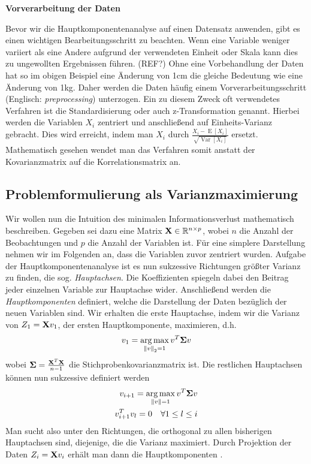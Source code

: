 \textbf{Vorverarbeitung der Daten}

Bevor wir die Hauptkomponentenanalyse auf einen Datensatz anwenden, gibt es einen wichtigen Bearbeitungsschritt zu beachten. Wenn eine Variable weniger variiert als eine Andere aufgrund der verwendeten Einheit oder Skala kann dies zu ungewollten Ergebnissen führen. (REF?) Ohne eine Vorbehandlung der Daten hat so im obigen Beispiel eine Änderung von 1cm die gleiche Bedeutung wie eine Änderung von 1kg.  Daher werden die Daten häufig einem Vorverarbeitungsschritt (Englisch: \textit{preprocessing}) unterzogen. Ein zu diesem Zweck oft verwendetes Verfahren ist die Standardisierung oder auch z-Transformation genannt. Hierbei werden die Variablen $X_i$ zentriert und anschließend auf Einheits-Varianz gebracht. Dies wird erreicht, indem man $X_i$ durch $\frac{X_i - \operatorname{E}[X_i]}{\sqrt{\operatorname{Var}[X_i]}}$ ersetzt. Mathematisch gesehen wendet man das Verfahren somit anstatt der Kovarianzmatrix auf die Korrelationsmatrix an.

\subsection{Problemformulierung als Varianzmaximierung}

Wir wollen nun die Intuition des minimalen Informationsverlust mathematisch beschreiben. Gegeben sei dazu eine Matrix $\mathbf{X} \in \mathbb{R}^{n\times p}$, wobei $n$ die Anzahl der Beobachtungen und $p$ die Anzahl der Variablen ist. Für eine simplere Darstellung nehmen wir im Folgenden an, dass die Variablen zuvor zentriert wurden. Aufgabe der Hauptkomponentenanalyse ist es nun sukzessive Richtungen größter Varianz zu finden, die sog. \textit{Hauptachsen}. Die Koeffizienten spiegeln dabei den Beitrag jeder einzelnen Variable zur Hauptachse wider. Anschließend werden die \textit{Hauptkomponenten} definiert, welche die Darstellung der Daten bezüglich der neuen Variablen sind. Wir erhalten die erste Hauptachse, indem wir die Varianz von $Z_1 = \mathbf{X}v_1$, der ersten Hauptkomponente, maximieren, d.h.
\begin{align}
v_1 = \operatorname*{arg\,max}_{\left\lVert v \right\rVert_2 = 1} v^T \mathbf{\Sigma} v
\end{align}
wobei $\mathbf{\Sigma} = \frac{\mathbf{X}^T\mathbf{X}}{n-1}$ die Stichprobenkovarianzmatrix ist. Die restlichen Hauptachsen können nun sukzessive definiert werden
\begin{align}
\label{pca_variance_maximization}
\begin{split}
v_{i+1} = \operatorname*{arg\,max}_{\left\lVert v \right\rVert = 1} v^T \mathbf{\Sigma} v\\
v_{i+1}^Tv_l = 0 \quad \forall 1 \leq l \leq i
\end{split}
\end{align}
Man sucht also unter den Richtungen, die orthogonal zu allen bisherigen Hauptachsen sind, diejenige, die die Varianz maximiert. Durch Projektion der Daten $Z_i = \mathbf{X}v_i$ erhält man dann die Hauptkomponenten \cite{vidal}.

